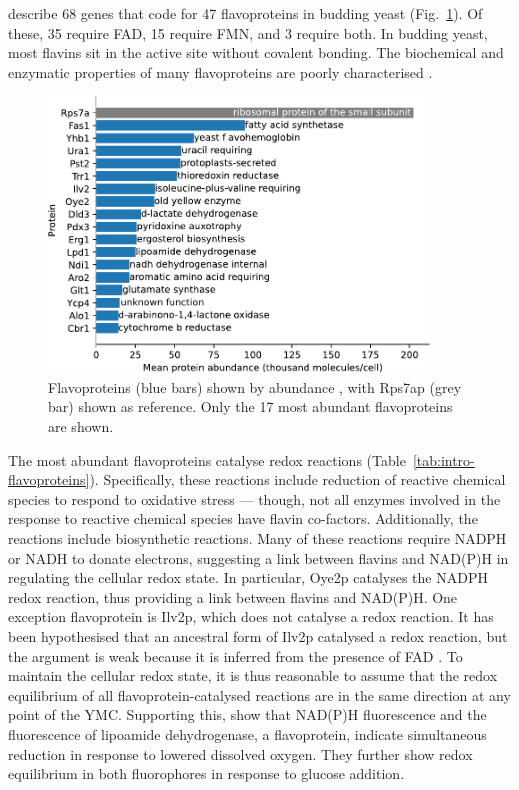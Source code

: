 \textcite{gudipatiFlavoproteomeYeastSaccharomyces2014} describe 68 genes that code for 47 flavoproteins in budding yeast (Fig.\ \ref{fig:intro-flavoprotein-abundance}).
Of these, 35 require FAD, 15 require FMN, and 3 require both.
In budding yeast, most flavins sit in the active site without covalent bonding.
The biochemical and enzymatic properties of many flavoproteins are poorly characterised \parencite{kochStructureBiochemicalKinetic2017}.

\begin{figure}
  \centering
  \includegraphics[width=0.9\textwidth]{flavoprotein_abundance_bar}
  \caption[
    Flavoproteins shown by abundance
  ]{
    Flavoproteins (blue bars) shown by abundance \parencite{hoUnificationProteinAbundance2018}, with Rps7ap (grey bar) shown as reference.
    Only the 17 most abundant flavoproteins are shown.
    }
  \label{fig:intro-flavoprotein-abundance}
\end{figure}

The most abundant flavoproteins catalyse redox reactions (Table~\ref{tab:intro-flavoproteins}).
Specifically, these reactions include reduction of reactive chemical species to respond to oxidative stress --- though, not all enzymes involved in the response to reactive chemical species have flavin co-factors.
Additionally, the reactions include biosynthetic reactions.
Many of these reactions require NADPH or NADH to donate electrons, suggesting a link between flavins and NAD(P)H in regulating the cellular redox state.
In particular, Oye2p catalyses the NADPH redox reaction, thus providing a link between flavins and NAD(P)H\@.
One exception flavoprotein is Ilv2p, which does not catalyse a redox reaction.
It has been hypothesised that an ancestral form of Ilv2p catalysed a redox reaction, but the argument is weak because it is inferred from the presence of FAD \parencite{pangCrystalStructureYeast2002}.
To maintain the cellular redox state, it is thus reasonable to assume that the redox equilibrium of all flavoprotein-catalysed reactions are in the same direction at any point of the YMC\@.
Supporting this, \textcite{sianoNADHFlavinFluorescence1989} show that NAD(P)H fluorescence and the fluorescence of lipoamide dehydrogenase, a flavoprotein, indicate simultaneous reduction in response to lowered dissolved oxygen.
They further show redox equilibrium in both fluorophores in response to glucose addition.

